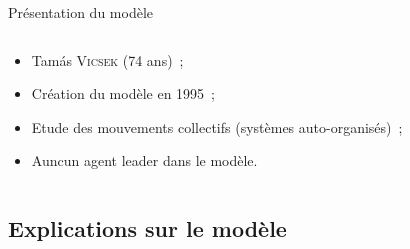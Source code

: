 \documentclass[aspectratio=43, a4paper, 12pt]{beamer}
\begin{document}
\begin{frame}{Présentation du modèle}
\begin{columns}
			\begin{column}{0.5\paperwidth}
				\begin{itemize}
					\item<1-> Tamás \textsc{Vicsek} (74 ans)~;
					\item<2-> Création du modèle en 1995~;
					\item<3-> Etude des mouvements collectifs (systèmes auto-organisés)~;
					\item<4-> Auncun agent leader dans le modèle.
				\end{itemize}			
			\end{column}
		\end{columns}		
	\end{frame}
	
\subsection{Explications sur le modèle}
\end{document}
